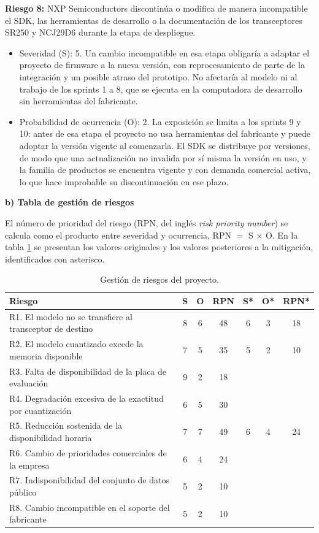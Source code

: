 \documentclass[
11pt, %
]{charter}
\begin{document}
\textbf{Riesgo 8:} NXP Semiconductors discontinúa o modifica de manera incompatible el SDK, las herramientas de desarrollo o la documentación de los transceptores SR250 y NCJ29D6 durante la etapa de despliegue.
\begin{itemize}
    \item Severidad (S): 5. Un cambio incompatible en esa etapa obligaría a adaptar el proyecto de firmware a la nueva versión, con reprocesamiento de parte de la integración y un posible atraso del prototipo. No afectaría al modelo ni al trabajo de los sprints 1 a 8, que se ejecuta en la computadora de desarrollo sin herramientas del fabricante.
    \item Probabilidad de ocurrencia (O): 2. La exposición se limita a los sprints 9 y 10: antes de esa etapa el proyecto no usa herramientas del fabricante y puede adoptar la versión vigente al comenzarla. El SDK se distribuye por versiones, de modo que una actualización no invalida por sí misma la versión en uso, y la familia de productos se encuentra vigente y con demanda comercial activa, lo que hace improbable su discontinuación en ese plazo.
\end{itemize}

\textbf{b) Tabla de gestión de riesgos}

El número de prioridad del riesgo (RPN, del inglés \textit{risk priority number}) se calcula como el producto entre severidad y ocurrencia, RPN $=$ S $\times$ O. En la tabla \ref{tab:riesgos} se presentan los valores originales y los valores posteriores a la mitigación, identificados con asterisco.

\begin{table}[htpb]
\centering
\caption{Gestión de riesgos del proyecto.}
\label{tab:riesgos}
\begin{tabularx}{\linewidth}{@{}|X|c|c|c|c|c|c|@{}}
\hline
\rowcolor[HTML]{C0C0C0}
Riesgo & S & O & RPN & S* & O* & RPN* \\ \hline
R1. El modelo no se transfiere al transceptor de destino & 8 & 6 & 48 & 6 & 3 & 18 \\ \hline
R2. El modelo cuantizado excede la memoria disponible & 7 & 5 & 35 & 5 & 2 & 10 \\ \hline
R3. Falta de disponibilidad de la placa de evaluación & 9 & 2 & 18 & & & \\ \hline
R4. Degradación excesiva de la exactitud por cuantización & 6 & 5 & 30 & & & \\ \hline
R5. Reducción sostenida de la disponibilidad horaria & 7 & 7 & 49 & 6 & 4 & 24 \\ \hline
R6. Cambio de prioridades comerciales de la empresa & 6 & 4 & 24 & & & \\ \hline
R7. Indisponibilidad del conjunto de datos público & 5 & 2 & 10 & & & \\ \hline
R8. Cambio incompatible en el soporte del fabricante & 5 & 2 & 10 & & & \\ \hline
\end{tabularx}%
\end{table}
\end{document}
